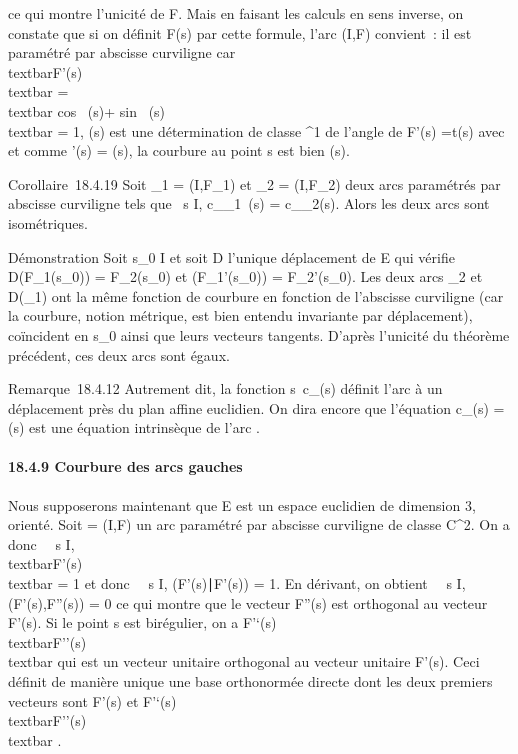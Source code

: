 \documentclass[]{article}
\begin{document}
ce qui montre l'unicité de F. Mais en faisant les calculs en sens
inverse, on constate que si on définit F(s) par cette formule, l'arc
(I,F) convient~: il est paramétré par abscisse curviligne car
\\textbar{}F'(s)\\textbar{}
=\\textbar{} cos~
\phi(s)\vec\imath + sin~
\phi(s)\\textbar{} = 1, \phi(s) est une
détermination de classe ^1 de l'angle de F'(s)
=\vec t(s) avec \vec\imath et comme
\phi'(s) = \gamma(s), la courbure au point s est bien \gamma(s).

Corollaire~18.4.19 Soit \Gamma\_1 = (I,F\_1) et \Gamma\_2
= (I,F\_2) deux arcs paramétrés par abscisse curviligne tels que
\forall~s \in I, c\_\Gamma\_1~(s) =
c\_\Gamma\_2(s). Alors les deux arcs sont isométriques.

Démonstration Soit s\_0 \in I et soit D l'unique déplacement de E
qui vérifie D(F\_1(s\_0)) = F\_2(s\_0)
et \overrightarrowD(F\_1'(s\_0)) =
F\_2'(s\_0). Les deux arcs \Gamma\_2 et
D(\Gamma\_1) ont la même fonction de courbure en fonction de
l'abscisse curviligne (car la courbure, notion métrique, est bien
entendu invariante par déplacement), coïncident en s\_0 ainsi
que leurs vecteurs tangents. D'après l'unicité du théorème précédent,
ces deux arcs sont égaux.

Remarque~18.4.12 Autrement dit, la fonction
s\mapsto~c\_\Gamma(s) définit l'arc \Gamma à un
déplacement près du plan affine euclidien. On dira encore que l'équation
c\_\Gamma(s) = \gamma(s) est une équation intrinsèque de l'arc \Gamma.

\paragraph{18.4.9 Courbure des arcs gauches}

Nous supposerons maintenant que E est un espace euclidien de dimension
3, orienté. Soit \Gamma = (I,F) un arc paramétré par abscisse curviligne de
classe C^2. On a donc \forall~~s \in I,
\\textbar{}F'(s)\\textbar{} = 1 et donc
\forall~~s \in I,
(F'(s)∣F'(s)) = 1. En dérivant, on obtient
\forall~~s \in I,(F'(s),F''(s)) = 0 ce qui montre que le
vecteur F''(s) est orthogonal au vecteur F'(s). Si le point s est
birégulier, on a  F'`(s) \over
\\textbar{}F''(s)\\textbar{} qui est un
vecteur unitaire orthogonal au vecteur unitaire F'(s). Ceci définit de
manière unique une base orthonormée directe dont les deux premiers
vecteurs sont F'(s) et  F'`(s) \over
\\textbar{}F''(s)\\textbar{} .
\end{document}
